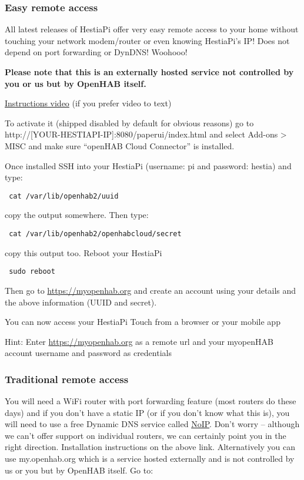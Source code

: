 \subsubsection{Easy remote access}
All latest releases of HestiaPi offer very easy remote access to your home
without touching your network modem/router or even knowing HestiaPi's IP! Does
not depend on port forwarding or DynDNS! Woohooo!

\textbf{Please note that this is an externally hosted service not controlled by
you or us but by OpenHAB itself.}

\href{https://www.youtube.com/watch?v=joz5f4ejJVc}{Instructions video} (if you
prefer video to text)

To activate it (shipped disabled by default for obvious reasons) go to
http://[YOUR-HESTIAPI-IP]:8080/paperui/index.html and select Add-ons > MISC and make
sure ``openHAB Cloud Connector'' is installed.

Once installed SSH into your HestiaPi (username: pi and password: hestia) and
type:

\texttt{    cat /var/lib/openhab2/uuid}

 copy the output somewhere. Then type:

\texttt{        cat /var/lib/openhab2/openhabcloud/secret}

copy this output too. Reboot your HestiaPi

\texttt{        sudo reboot}

    
Then go to \url{https://myopenhab.org} and create an account using your details
and the above information (UUID and secret).

You can now access your HestiaPi Touch from a browser or your mobile app

Hint: Enter \url{https://myopenhab.org} as a remote url and your myopenHAB
account username and password as credentials

\subsubsection{Traditional remote access}

You will need a WiFi router with port forwarding feature (most routers do these
days) and if you don’t have a static IP (or if you don’t know what this is),
you will need to use a free Dynamic DNS service called
\href{https://www.noip.com/support/knowledgebase/install-ip-duc-onto-raspberry-pi/}{NoIP}.
Don’t worry -- although we can’t offer support on individual routers, we can
certainly point you in the right direction. Installation instructions on the
above link.  Alternatively you can use my.openhab.org which is a service hosted
externally and is not controlled by us or you but by OpenHAB itself. Go to:

